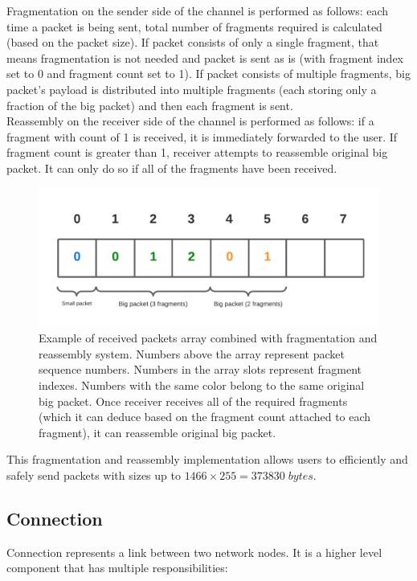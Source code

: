 \documentclass[times, utf8, diplomski]{fer}
\begin{document}
Fragmentation on the sender side of the channel is performed as follows: each time a packet is being sent, total number of fragments required is calculated (based on the packet size). If packet consists of only a single fragment, that means fragmentation is not needed and packet is sent as is (with fragment index set to 0 and fragment count set to 1). If packet consists of multiple fragments, big packet's payload is distributed into multiple fragments (each storing only a fraction of the big packet) and then each fragment is sent. \\

Reassembly on the receiver side of the channel is performed as follows: if a fragment with count of 1 is received, it is immediately forwarded to the user. If fragment count is greater than 1, receiver attempts to reassemble original big packet. It can only do so if all of the fragments have been received.

\begin{figure}[H]
	\centering
	\includegraphics[scale=0.3]{Fragmentation-pending-packets}
	\caption{Example of received packets array combined with fragmentation and reassembly system. Numbers above the array represent packet sequence numbers. Numbers in the array slots represent fragment indexes. Numbers with the same color belong to the same original big packet. Once receiver receives all of the required fragments (which it can deduce based on the fragment count attached to each fragment), it can reassemble original big packet. }
\end{figure}

This fragmentation and reassembly implementation allows users to efficiently and safely send packets with sizes up to $1466 \times 255 = 373830 \; bytes$.



\subsection{Connection}
Connection represents a link between two network nodes. It is a higher level component that has multiple responsibilities:
\end{document}
